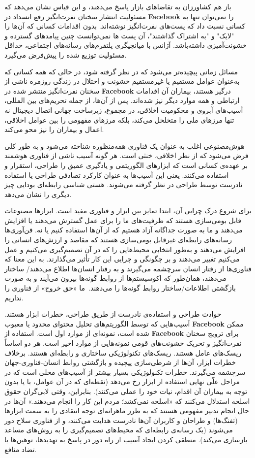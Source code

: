 باز هم کشاورزان به تقاضاهای بازار پاسخ می‌دهند، و این قیاس نشان می‌دهد که مسئولیت انتشار سخنان نفرت‌انگیز رفع انسداد در \textenglish{\textbf{Facebook}} را نمی‌توان تنها به کسانی نسبت داد که پست‌های نفرت‌انگیز نوشته‌اند.
بدون اقدامات کسانی که آن‌ها را "لایک" و "به اشتراک گذاشتند"، آن پست ها نمی‌توانست چنین پیامدهای گسترده و خشونت‌آمیزی داشته‌باشد.
آژانس با میانجیگری پلتفرم‌های رسانه‌های اجتماعی، حداقل مسئولیت توزیع شده را پیش‌فرض می‌گیرد.

مسائل زمانی پیچیده‌تر می‌شود که در نظر گرفته شود، در حالی که همه کسانی که به‌عنوان عوامل مستقیم یا غیرمستقیم خشونت و اختلال در زندگی روزمره ناشی از سخنان نفرت‌انگیز منتشر شده در \textenglish{\textbf{Facebook}} درگیر هستند، بیماران آن اقدامات ارتباطی و همه موارد دیگر نیز شده‌اند.
پس از آن‌ها، از جمله تحریم‌های بین المللی، آسیب‌های آبروی و محکومیت اخلاقی، در مجموع، زیرساخت جهانی اتصال دیجیتال نه تنها مرزهای ملی را متخلخل می‌کند، بلکه مرزهای مفهومی را بین عوامل اخلاقی، اعمال و بیماران را نیز محو می‌کند.

هوش‌مصنوعی اغلب به عنوان یک فناوری همه‌منظوره شناخته می‌شود و به طور کلی فرض می‌شود که از نظر اخلاقی، خنثی است.
هر گونه آسیب ناشی از فناوری هوشمند بر عهده‌ی کسانی است که ابزارهای الگوریتمی و یادگیری عمیق را طراحی، استقرار و استفاده می‌کنند.
یعنی این آسیب‌ها به عنوان کارکرد تصادفی طراحی یا استفاده نادرست توسط طراحی در نظر گرفته می‌شوند.
هستی شناسی رابطه‌ای بودایی چیز دیگری را نشان می‌دهد.

برای شروع درک چرایی آن، ابتدا تمایز بین ابزار و فناوری مفید است.
ابزارها مصنوعات قابل بومی‌سازی هستند که ظرفیت‌های ما را برای عمل گسترش می‌دهند یا افزایش می‌دهند و ما به صورت جداگانه آزاد هستیم که از آن‌ها استفاده کنیم یا نه.
فن‌آوری‌ها رسانه‌های رابطه‌ای غیر‌قابل بومی‌سازی هستند که مقاصد و ارزش‌های انسانی را افزایش می‌دهند و به‌طور انتخابی محیط‌هایی را که در آن تصمیم‌گیری می‌کنیم و عمل می‌کنیم تغییر می‌دهند و بر چگونگی و چرایی این کار تأثیر می‌گذارند.
به این معنا که فناوری‌ها از رفتار انسان سرچشمه می‌گیرند و به رفتار انسان‌ها اطلاع می‌دهند/ ساختار می‌دهند، همان‌طور که اکوسیستم‌ها از روابط گونه‌ها بیرون می‌آیند و به صورت بازگشتی اطلاعات/ساختار روابط گونه‌ها را می‌دهند.\ ما «حق خروج» از فناوری را نداریم.


حوادث طراحی و استفاده‌ی نادرست از طریق طراحی، خطرات ابزار هستند.
آسیب‌هایی که توسط الگوریتم‌های تحلیل محتوای محدود یا معیوب \textenglish{\textbf{Facebook}} ممکن شده است، نمونه‌ای از موارد اول است.
استفاده از \textenglish{\textbf{Facebook}} برای ترویج سخنان نفرت‌انگیز و تحریک خشونت‌های قومی نمونه‌هایی از موارد اخیر است.
هر دو اساساً ریسک‌های عامل هستند.
ریسک‌های تکنولوژیکی ساختاری و رابطه‌ای هستند.
برخلاف خطرات ابزار، آن‌ها از شرطی‌سازی پیچیده و بازگشتی روابط انسان-فناوری-جهان سرچشمه می‌گیرند.
خطرات تکنولوژیکی بسیار بیشتر از آسیب‌های محلی است که در مراحل علّی نهایی استفاده از ابزار رخ می‌دهد (نقطه‌ای که در آن عوامل، با یا بدون توجه به بیماران آن اقدام، نیات خود را عملی می‌کنند).
بنابراین، وقتی لابی‌گران حقوق اسلحه استدلال می‌کنند که «اسلحه نمی‌کشد؛ مردم این کار را انجام می‌دهند.» آن‌ها در حال انجام تدبیر مفهومی هستند که به طرز ماهرانه‌ای توجه انتقادی را به سمت ابزارها (تفنگ‌ها) و طراحان و کاربران آن‌ها نادرست هدایت می‌کنند، و از فناوری سلاح دور می‌شوند (یک رسانه‌ی رابطه‌ای که محیط‌های تصمیم‌گیری را به روش‌های مساعد بازسازی می‌کند).
منطقی کردن ایجاد آسیب از راه دور در پاسخ به تهدیدها، توهین‌ها یا تضاد منافع.

